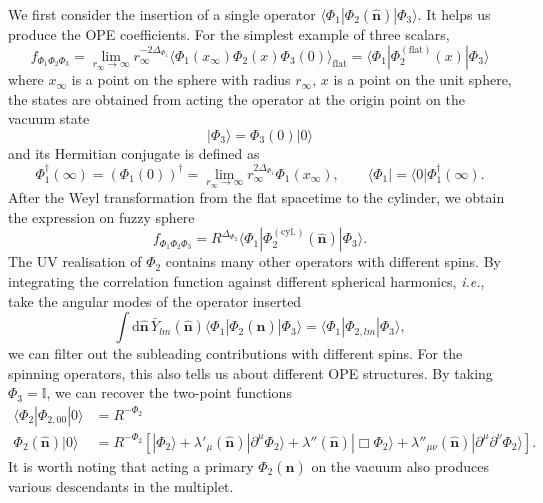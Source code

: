 \documentclass{timesjhep}
\begin{document}
We first consider the insertion of a single operator $\langle\Phi_1|\Phi_2(\hat{\mathbf{n}})|\Phi_3\rangle$. It helps us produce the OPE coefficients. For the simplest example of three scalars, \begin{equation} f_{\Phi_1\Phi_2\Phi_3}=\lim_{r_\infty\to\infty}r_\infty^{-2\Delta_{\Phi_1}}\langle \Phi_1(x_\infty)\Phi_2(x)\Phi_3(0)\rangle_\mathrm{flat}=\langle\Phi_1|\Phi_2^{(\mathrm{flat})}(x)|\Phi_3\rangle \end{equation} where $x_\infty$ is a point on the sphere with radius $r_\infty$, $x$ is a point on the unit sphere, the states are obtained from acting the operator at the origin point on the vacuum state
\begin{equation} 
    |\Phi_3\rangle=\Phi_3(0)|0\rangle 
\end{equation} 
and its Hermitian conjugate is defined as 
\begin{equation}
    \Phi_1^\dagger(\infty)=(\Phi_1(0))^\dagger=\lim_{r_\infty\to\infty}r_\infty^{2\Delta_{\Phi_1}}\Phi_1(x_\infty),\qquad\langle\Phi_1|=\langle0|\Phi_1^\dagger(\infty).
\end{equation} 
After the Weyl transformation from the flat spacetime to the cylinder, we obtain the expression on fuzzy sphere 
\begin{equation}
    f_{\Phi_1\Phi_2\Phi_3}=R^{\Delta_{\Phi_2}}\langle\Phi_1|\Phi^{(\mathrm{cyl.})}_2(\hat{\mathbf{n}})|\Phi_3\rangle.
\end{equation} 
The UV realisation of $\Phi_2$ contains many other operators with different spins. By integrating the correlation function against different spherical harmonics, \textit{i.e.}, take the angular modes of the operator inserted 
\begin{equation}
    \int\mathrm{d}\hat{\mathbf{n}}\,\bar{Y}_{lm}(\hat{\mathbf{n}})\langle\Phi_1|\Phi_2(\hat{\mathbf{n}})|\Phi_3\rangle=\langle\Phi_1|\Phi_{2,lm}|\Phi_3\rangle,
\end{equation} 
we can filter out the subleading contributions with different spins. For the spinning operators, this also tells us about different OPE structures. By taking $\Phi_3=\mathbb{I}$, we can recover the two-point functions 
\begin{align}
    \langle\Phi_2|\Phi_{2,00}|0\rangle&=R^{-\Phi_2}\nonumber\\
    \Phi_2(\hat{\mathbf{n}})|0\rangle&=R^{-\Phi_2}\left[|\Phi_2\rangle+\lambda'_\mu(\hat{\mathbf{n}})|\partial^\mu\Phi_2\rangle+\lambda''(\hat{\mathbf{n}})|\Box\Phi_2\rangle+\lambda''_{\mu\nu}(\hat{\mathbf{n}})|\partial^\mu\partial^\nu\Phi_2\rangle\right].
\end{align} 
It is worth noting that acting a primary $\Phi_2(\hat{\mathbf{n}})$ on the vacuum also produces various descendants in the multiplet. 
\end{document}
